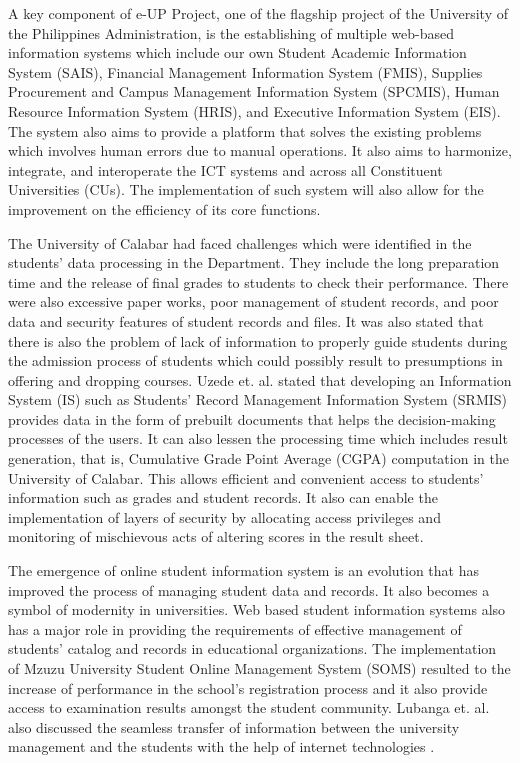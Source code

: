 \documentclass[11pt,a4paper,titlepage]{article}
\begin{document}
A key component of e-UP Project, one of the flagship project of the University of the Philippines Administration, is the establishing of multiple web-based information systems which include our own Student Academic Information System (SAIS), Financial Management Information System (FMIS), Supplies Procurement and Campus Management Information System (SPCMIS), Human Resource Information System (HRIS), and Executive Information System (EIS). The system also aims to provide a platform that solves the existing problems which involves human errors due to manual operations. It also aims to harmonize, integrate, and interoperate the ICT systems and across all Constituent Universities (CUs). The implementation of such system will also allow for the improvement on the efficiency of its core functions.  \cite{Caro} 

The University of Calabar had faced challenges which were identified in the students' data processing in the Department. They include the long preparation time and the release of final grades to students to check their performance. There were also excessive paper works, poor management of student records, and poor data and security features of student records and files. It was also stated that there is also the problem of lack of information to properly guide students during the admission process of students which could possibly result to presumptions in offering and dropping courses. Uzede et. al. stated that developing an Information System (IS) such as Students' Record Management Information System (SRMIS) provides data in the form of prebuilt documents that helps the decision-making processes of the users. It can also lessen the processing time which includes result generation, that is, Cumulative Grade Point Average (CGPA) computation in the University of Calabar. This allows efficient and convenient access to students' information such as grades and student records. It also can enable the implementation of layers of security by allocating access privileges and monitoring of mischievous acts of altering scores in the result sheet.\cite{Ude}

The emergence of online student information system is an evolution that has improved the process of managing student data and records. It also becomes a symbol of modernity in universities. Web based student information systems also has a major role in providing the requirements of effective management of students' catalog and records in educational organizations. The implementation of Mzuzu University Student Online Management System (SOMS) resulted to the increase of performance in the school's registration process and it also provide access to examination results amongst the student community. Lubanga et. al. also discussed the seamless transfer of information between the university management and the students with the help of internet technologies \cite{Lubanga}. 
\end{document}
